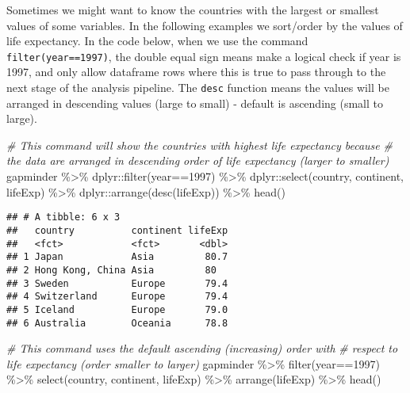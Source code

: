 \documentclass[
]{book}
\newenvironment{Shaded}{\begin{snugshade}}{\end{snugshade}}
\newcommand{\CommentTok}[1]{\textcolor[rgb]{0.56,0.35,0.01}{\textit{#1}}}
\newcommand{\DecValTok}[1]{\textcolor[rgb]{0.00,0.00,0.81}{#1}}
\newcommand{\FunctionTok}[1]{\textcolor[rgb]{0.00,0.00,0.00}{#1}}
\newcommand{\NormalTok}[1]{#1}
\newcommand{\SpecialCharTok}[1]{\textcolor[rgb]{0.00,0.00,0.00}{#1}}
\begin{document}
Sometimes we might want to know the countries with the largest or smallest values of some variables. In the following examples we sort/order by the values of life expectancy. In the code below, when we use the command \texttt{filter(year==1997)}, the double equal sign means make a logical check if year is 1997, and only allow dataframe rows where this is true to pass through to the next stage of the analysis pipeline. The \texttt{desc} function means the values will be arranged in descending values (large to small) - default is ascending (small to large).

\begin{Shaded}
\begin{Highlighting}[]
\CommentTok{\# This command will show the countries with highest life expectancy because }
\CommentTok{\# the data are arranged in descending order of life expectancy (larger to smaller)}
\NormalTok{gapminder }\SpecialCharTok{\%\textgreater{}\%} 
\NormalTok{  dplyr}\SpecialCharTok{::}\FunctionTok{filter}\NormalTok{(year}\SpecialCharTok{==}\DecValTok{1997}\NormalTok{) }\SpecialCharTok{\%\textgreater{}\%}   
\NormalTok{  dplyr}\SpecialCharTok{::}\FunctionTok{select}\NormalTok{(country, continent, lifeExp) }\SpecialCharTok{\%\textgreater{}\%} 
\NormalTok{  dplyr}\SpecialCharTok{::}\FunctionTok{arrange}\NormalTok{(}\FunctionTok{desc}\NormalTok{(lifeExp)) }\SpecialCharTok{\%\textgreater{}\%} 
  \FunctionTok{head}\NormalTok{()}
\end{Highlighting}
\end{Shaded}

\begin{verbatim}
## # A tibble: 6 x 3
##   country          continent lifeExp
##   <fct>            <fct>       <dbl>
## 1 Japan            Asia         80.7
## 2 Hong Kong, China Asia         80  
## 3 Sweden           Europe       79.4
## 4 Switzerland      Europe       79.4
## 5 Iceland          Europe       79.0
## 6 Australia        Oceania      78.8
\end{verbatim}

\begin{Shaded}
\begin{Highlighting}[]
\CommentTok{\# This command uses the default ascending (increasing) order with}
\CommentTok{\# respect to life expectancy (order smaller to larger)}
\NormalTok{gapminder }\SpecialCharTok{\%\textgreater{}\%} 
  \FunctionTok{filter}\NormalTok{(year}\SpecialCharTok{==}\DecValTok{1997}\NormalTok{) }\SpecialCharTok{\%\textgreater{}\%}  
  \FunctionTok{select}\NormalTok{(country, continent, lifeExp) }\SpecialCharTok{\%\textgreater{}\%} 
  \FunctionTok{arrange}\NormalTok{(lifeExp) }\SpecialCharTok{\%\textgreater{}\%} 
  \FunctionTok{head}\NormalTok{()}
\end{Highlighting}
\end{Shaded}
\end{document}
